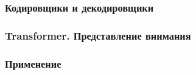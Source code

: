 

\subsubsection{Кодировщики и декодировщики}



\subsubsection{Transformer. Представление внимания}



\subsubsection{Применение}

